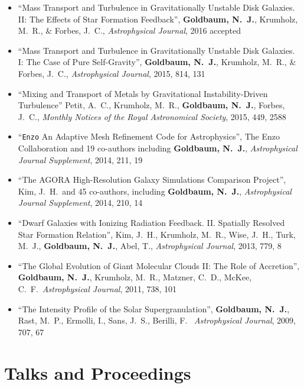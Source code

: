 \documentclass[10pt,letterpaper]{article}
\begin{document}
\begin{itemize}
  
  \item[] ``Mass Transport and Turbulence in Gravitationally Unstable Disk Galaxies. II:
    The Effects of Star Formation Feedback'', {\bf Goldbaum, N.~J.}, Krumholz, M.~R., \& Forbes,
    J.~C., {\it Astrophysical Journal}, 2016 accepted
  \item[] ``Mass Transport and Turbulence in Gravitationally Unstable Disk Galaxies. I:
    The Case of Pure Self-Gravity'', {\bf Goldbaum, N.~J.}, Krumholz, M.~R., \& Forbes,
    J.~C., {\it Astrophysical Journal}, 2015, 814, 131
  \item [] ``Mixing and Transport of Metals by Gravitational Instability-Driven
    Turbulence'' Petit, A.~C., Krumholz, 
    M.~R., {\bf Goldbaum, N.~J.}, Forbes, J.~C., {\it Monthly Notices of
      the Royal Astronomical Society}, 2015, 449, 2588
  \item[] ``\texttt{Enzo} An Adaptive Mesh Refinement Code for Astrophysics'', The
    Enzo Collaboration and 19 co-authors including {\bf Goldbaum, N.~J.}, {\it
      Astrophysical Journal Supplement}, 2014, 211, 19
  \item[] ``The AGORA High-Resolution Galaxy Simulations Comparison Project'',
    Kim, J.~H.\ and 45 co-authors, including {\bf Goldbaum, N.~J.}, {\it
      Astrophysical Journal Supplement}, 2014, 210, 14
  \item[] ``Dwarf Galaxies with Ionizing Radiation Feedback. II. Spatially
    Resolved Star Formation Relation'', Kim, J.~H., Krumholz, M.~R., Wise,
    J.~H., Turk, M.~J., {\bf Goldbaum, N.~J.}, Abel, T., {\it Astrophysical Journal},
    2013, 779, 8
  \item[] ``The Global Evolution of Giant Molecular Clouds II: The Role of
    Accretion'', {\bf Goldbaum, N.~J.}, Krumholz, M.~R., Matzner, C.~D., McKee,
    C.~F.\ {\it Astrophysical Journal}, 2011, 738, 101
  \item[] ``The Intensity Profile of the Solar Supergranulation'', {\bf Goldbaum,
      N.~J.}, Rast, M.~P., Ermolli, I., Sans, J.~S., Berilli, F.\ {\it
      Astrophysical Journal}, 2009, 707, 67

\end{itemize}

\section*{Talks and Proceedings}
\end{document}

